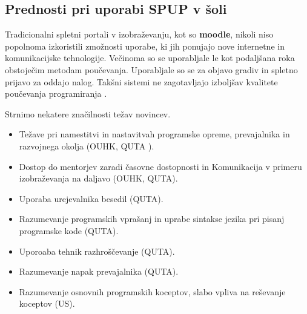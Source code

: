 \subsection{Prednosti pri uporabi SPUP v šoli }
\label{sec:Prednosti_pri_uporavi_SPUP}




Tradicionalni spletni portali v izobraževanju, kot so \textbf{moodle},
nikoli niso popolnoma izkoristili zmožnosti uporabe, ki jih ponujajo
nove internetne in komunikacijske tehnologije. Večinoma so se
uporabljale le kot podaljšana roka obstoječim metodam
poučevanja. Uporabljale so se za objavo gradiv in spletno prijavo za
oddajo nalog. Takšni sistemi ne zagotavljajo izboljšav kvalitete
poučevanja programiranja \cite{ITaLCP_DistanceEdu}.

Strnimo nekatere značilnosti težav novincev.

\begin{itemize}
\tightlist
\item Težave pri namestitvi in nastavitvah programske opreme,
  prevajalnika in razvojnega okolja (OUHK, QUTA ).
\item Dostop do mentorjev zaradi časovne dostopnosti in Komunikacija v
  primeru izobraževanja na daljavo (OUHK, QUTA).
\item Uporaba urejevalnika besedil (QUTA).
\item Razumevanje programskih vprašanj in uprabe sintakse jezika pri
  pisanj programske kode (QUTA).
\item Uporoaba tehnik razhroščevanje (QUTA).
\item Razumevanje napak prevajalnika (QUTA).
\item Razumevanje osnovnih programskih koceptov, slabo vpliva na
  reševanje koceptov (US).
\end{itemize}

